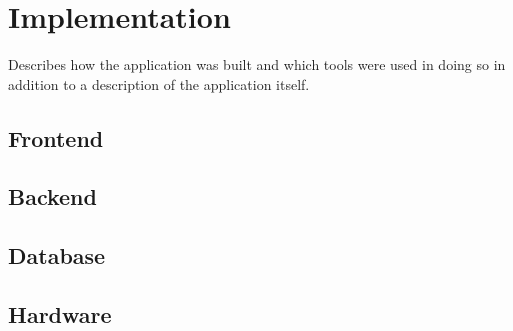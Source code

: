 \chapter{Implementation}
Describes how the application was built and which tools were used in doing so in addition to a description of the application itself.

\section{Frontend}

\section{Backend}

\section{Database}

\section{Hardware}